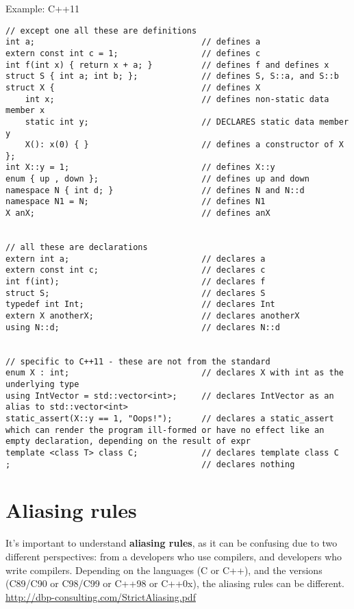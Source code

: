 Example: C++11
{\small \begin{verbatim}
// except one all these are definitions
int a;                                  // defines a
extern const int c = 1;                 // defines c
int f(int x) { return x + a; }          // defines f and defines x
struct S { int a; int b; };             // defines S, S::a, and S::b
struct X {                              // defines X
    int x;                              // defines non-static data member x
    static int y;                       // DECLARES static data member y
    X(): x(0) { }                       // defines a constructor of X
};
int X::y = 1;                           // defines X::y
enum { up , down };                     // defines up and down
namespace N { int d; }                  // defines N and N::d
namespace N1 = N;                       // defines N1
X anX;                                  // defines anX


// all these are declarations
extern int a;                           // declares a
extern const int c;                     // declares c
int f(int);                             // declares f
struct S;                               // declares S
typedef int Int;                        // declares Int
extern X anotherX;                      // declares anotherX
using N::d;                             // declares N::d


// specific to C++11 - these are not from the standard
enum X : int;                           // declares X with int as the underlying type
using IntVector = std::vector<int>;     // declares IntVector as an alias to std::vector<int>
static_assert(X::y == 1, "Oops!");      // declares a static_assert which can render the program ill-formed or have no effect like an empty declaration, depending on the result of expr
template <class T> class C;             // declares template class C
;                                       // declares nothing
\end{verbatim}}



\section{Aliasing rules}
\label{sec:aliasing_rules}

It's important to understand {\bf aliasing rules}, as it can be confusing due to
two different perspectives: from a developers who use compilers, and developers
who write compilers. Depending on the languages (C or C++), and the versions
(C89/C90 or C98/C99 or C++98 or C++0x), the aliasing rules can be different.
\url{http://dbp-consulting.com/StrictAliasing.pdf}

